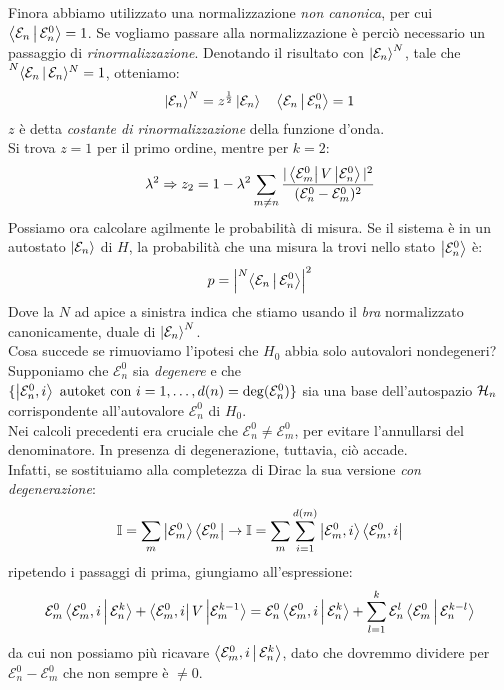 \documentclass[../../FisicaTeorica.tex]{subfiles}
\begin{document}
Finora abbiamo utilizzato una normalizzazione \textit{non canonica}, per cui $\Braket{\mathcal{E}_n|\mathcal{E}_n^0} = 1$. Se vogliamo passare alla normalizzazione  è perciò necessario un passaggio di \textit{rinormalizzazione}. 
Denotando il risultato con $\Ket{\mathcal{E}_n}^N$, tale che $\prescript{N}{}{\Braket{\mathcal{E}_n|\mathcal{E}_n}}^N = 1$, otteniamo:
\begin{align*}
\Ket{\mathcal{E}_n}^N = z^\frac{1}{2} \Ket{\mathcal{E}_n} \quad \Braket{\mathcal{E}_n| \mathcal{E}_n^0} = 1
\end{align*}
$z$ è detta \textit{costante di rinormalizzazione} della funzione d'onda.\\
Si trova $z=1$ per il primo ordine, mentre per $k=2$:
\begin{align*}
\lambda^2 \Rightarrow  z_2 = 1-\lambda^2 \sum_{m\neq n} \frac{|\Bra{\mathcal{E}_m^0}V\Ket{\mathcal{E}^0_n}|^2}{(\mathcal{E}_n^0 - \mathcal{E}_m^0)^2}
\end{align*}
Possiamo ora calcolare agilmente le probabilità di misura.
Se il sistema è in un autostato $\Ket{\mathcal{E}_n}$ di $H$, la probabilità che una misura la trovi nello stato $\Ket{\mathcal{E}^0_n}$ è:
\begin{align*}
p = \left| \prescript{N}{}{\Braket{\mathcal{E}_n | \mathcal{E}_n^0 }} \right|^2
\end{align*}
Dove la $N$ ad apice a sinistra indica che stiamo usando il \textit{bra} normalizzato canonicamente, duale di $\Ket{\mathcal{E}_n}^N$.\\

Cosa succede se rimuoviamo l'ipotesi che $H_0$ abbia solo autovalori nondegeneri?\\
Supponiamo che $\mathcal{E}^0_n$ sia \textit{degenere} e che $\{\Ket{\mathcal{E}^0_{n}, i} \text{ autoket con } i = 1, \dots, d(n) = \operatorname{deg}(\mathcal{E}_n^0) \}$ sia una base dell'autospazio $\mathcal{H}_n$ corrispondente all'autovalore $\mathcal{E}_n^0$ di $H_0$.\\
Nei calcoli precedenti era cruciale che $\mathcal{E}_n^0 \neq \mathcal{E}^0_m$, per evitare l'annullarsi del denominatore. In presenza di degenerazione, tuttavia, ciò accade.\\
Infatti, se sostituiamo alla completezza di Dirac la sua versione \textit{con degenerazione}:
\begin{align*}
\mathbb{I}=\sum_m \Ket{\mathcal{E}_m^0} \Bra{\mathcal{E}^0_m} \to \mathbb{I} = \sum_m \sum_{i=1}^{d(m)} \Ket{\mathcal{E}^0_m, i} \Bra{\mathcal{E}^0_m, i}
\end{align*}
ripetendo i passaggi di prima, giungiamo all'espressione:
\begin{align*}
\mathcal{E}_m^0 \Braket{\mathcal{E}_m^0,i|\mathcal{E}_n^k} + \Bra{\mathcal{E}_m^0,i}V \Ket{\mathcal{E}_m^{k-1}} = \mathcal{E}_n^0 \Braket{\mathcal{E}_m^0,i|\mathcal{E}_n^k} + \sum_{l=1}^k\mathcal{E}_n^l \Braket{\mathcal{E}_m^0|\mathcal{E}_n^{k-l}}
\end{align*}
da cui non possiamo più ricavare $\Braket{\mathcal{E}_m^0,i|\mathcal{E}_n^k}$, dato che dovremmo dividere per $\mathcal{E}_n^0-\mathcal{E}_m^0$ che non sempre è $\neq 0$.\\
\end{document}
